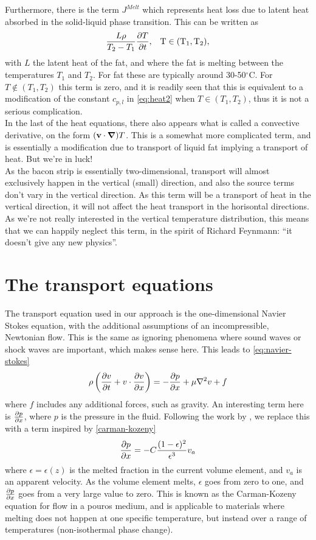 Furthermore, there is the term $J^{Melt}$ which represents heat loss due to
latent heat absorbed in the solid-liquid phase transition. This can be written as 
\[ \frac{L \rho}{T_2-T_1} \frac{\partial T}{\partial t} \rm{,} \quad T \in (T_1,T_2) \rm{,}\]
with $L$ the latent heat of the fat, and where the fat is melting between the temperatures 
$T_1$ and $T_2$. For fat these are typically around 30-50$^\circ$C. For $T
\notin (T_1,T_2)$ 
this term is zero, and it is readily seen that this is equivalent to a modification of the constant
$c_{p,l}$ in \cref{eq:heat2} when $T \in (T_1,T_2)$, thus it is not a serious
complication.\\

In the last of the heat equations, there also appears what is called a
convective derivative, on the form $(\mathbf{v}\cdot \mbox{\boldmath$ \nabla $})T$. This is a somewhat
more complicated term, and is essentially a modification due to transport of
liquid fat implying a transport of heat. But we're in luck! \\

As the bacon strip is essentially two-dimensional, transport will almost
exclusively happen in the vertical (small) direction, and also the
source terms don't vary in the vertical direction. As this term will be a transport
of heat in the vertical direction, it will not affect the heat transport in
the horisontal directions.  As we're not really
interested in the vertical temperature distribution, this means that we can
happily neglect this term, in the spirit of Richard Feynmann: ``it doesn't give
any new physics''.

\section{The transport equations}
The transport equation used in our approach is the one-dimensional Navier Stokes
equation, with the additional assumptions of an incompressible, Newtonian flow.
This is the same as ignoring phenomena where sound waves or shock waves are
important, which makes sense here. This leads to \cref{eq:navier-stokes}
\begin{equation}
  \rho \left(\frac{\partial v}{\partial t} + v \cdot \frac{\partial v}{\partial x}\right) = -\frac{\partial p}{\partial x} + \mu \nabla^2 v + f
 \label{eq:navier-stokes}
\end{equation}
where $f$ includes any additional forces, such as gravity. An interesting term here is $\frac{\partial p}{\partial x}$, where
$p$ is the pressure in the fluid. Following the work by \cite{brent}, we replace
this with a term inspired by \cref{carman-kozeny}
\begin{equation}
  \frac{\partial p}{\partial x} = -C\frac{ (1-\epsilon)^2}{\epsilon^3} v_a
  \label{carman-kozeny}
\end{equation}
where $\epsilon = \epsilon(z)$ is the melted fraction in the current volume element, and
$v_a$ is an apparent velocity. As the volume element melts, $\epsilon$ goes from
zero to one, and $\frac{\partial p}{\partial x}$ goes from a very large value to zero. This is known 
as the Carman-Kozeny equation for flow in a pouros medium, and is applicable to 
materials where melting does not happen at one specific temperature, but instead 
over a range of temperatures (non-isothermal phase change). \cite{poirier} \\

